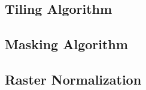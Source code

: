 \subsection{Tiling Algorithm}%
\label{sec:tiling-algorithm}


\subsection{Masking Algorithm}%
\label{sec:masking-algorithm}


\subsection{Raster Normalization}%
\label{sec:raster-normalization}

